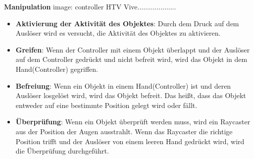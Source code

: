   \textbf{Manipulation}
  image: controller HTV Vive....................
  \begin{itemize}
  \item \textbf{Aktivierung der Aktivität des Objektes}: Durch dem Druck auf dem Auslöser wird es versucht, die Aktivität des Objektes zu aktivieren.
  \item \textbf{Greifen}: Wenn der Controller mit einem Objekt überlappt und der Auslöser auf dem Controller gedrückt und nicht befreit wird, wird das Objekt in dem Hand(Controller) gegriffen.
  \item \textbf{Befreiung}: Wenn ein Objekt in einem Hand(Controller) ist und deren Auslöser losgelöst wird, wird das Objekt befreit. Das heißt, dass das Objekt entweder auf eine bestimmte Position gelegt wird oder fällt.
  \item \textbf{Überprüfung}: Wenn ein Objekt überprüft werden muss, wird ein Raycaster aus der Position der Augen ausstrahlt. Wenn das Raycaster die richtige Position trifft und der Auslöser von einem leeren Hand gedrückt wird, wird die Überprüfung durchgeführt.
  \end{itemize}
  
